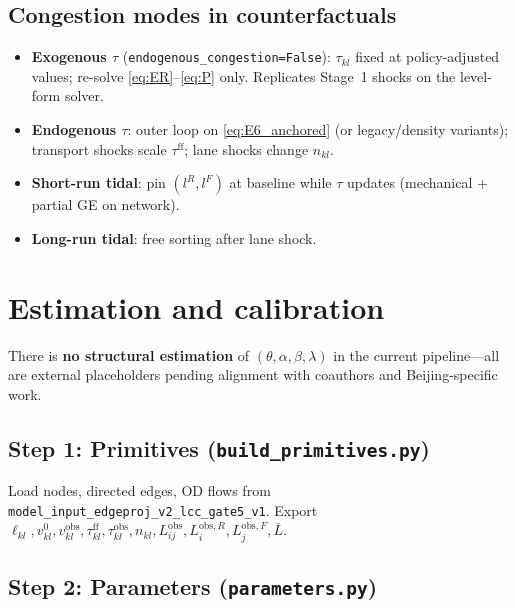 \documentclass[12pt]{article}
\newcommand{\Lbar}{\bar L}
\newcommand{\obs}{\mathrm{obs}}
\newcommand{\ff}{\mathrm{ff}}
\begin{document}
\subsection{Congestion modes in counterfactuals}

\begin{itemize}[leftmargin=2em]
  \item \textbf{Exogenous $\tau$} (\texttt{endogenous\_congestion=False}):
        $\tau_{kl}$ fixed at policy-adjusted values; re-solve
        \eqref{eq:ER}--\eqref{eq:P} only. Replicates Stage~1 shocks on the
        level-form solver.
  \item \textbf{Endogenous $\tau$}: outer loop on \eqref{eq:E6_anchored}
        (or legacy/density variants); transport shocks scale $\tau^{\ff}$;
        lane shocks change $n_{kl}$.
  \item \textbf{Short-run tidal}: pin $(l^R,l^F)$ at baseline while $\tau$
        updates (mechanical + partial GE on network).
  \item \textbf{Long-run tidal}: free sorting after lane shock.
\end{itemize}

\section{Estimation and calibration}\label{sec:estimation}

There is \textbf{no structural estimation} of $(\theta,\alpha,\beta,\lambda)$ in
the current pipeline---all are external placeholders pending alignment with
coauthors and Beijing-specific work.

\subsection{Step 1: Primitives (\texttt{build\_primitives.py})}

Load nodes, directed edges, OD flows from
\texttt{model\_input\_edgeproj\_v2\_lcc\_gate5\_v1}.
Export $\ell_{kl},v^0_{kl},v^{\obs}_{kl},\tau^{\ff}_{kl},\tau^{\obs}_{kl},
n_{kl},L^{\obs}_{ij},L^{\obs,R}_i,L^{\obs,F}_j,\Lbar$.

\subsection{Step 2: Parameters (\texttt{parameters.py})}
\end{document}
